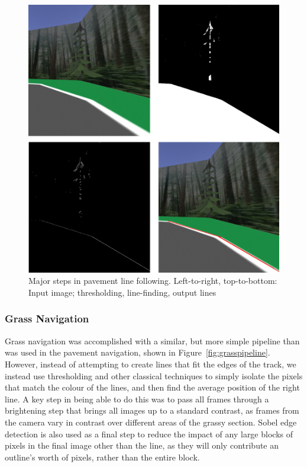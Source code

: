 \documentclass[titlepage, twocolumn]{article}
\begin{document}
            \begin{figure}
                \includegraphics[width=\linewidth]{lines.png}
                \caption{Major steps in pavement line following. Left-to-right, top-to-bottom: Input image; thresholding, line-finding, output lines}
                \label{fig:pavelinefollow}
            \end{figure}

        \subsubsection{Grass Navigation}

            Grass navigation was accomplished with a similar, but more simple pipeline than was used in the pavement navigation, shown in Figure~\ref{fig:grasspipeline}. However, instead of attempting to create lines that fit the edges of the track, we instead use thresholding and other classical techniques to simply isolate the pixels that match the colour of the lines, and then find the average position of the right line. A key step in being able to do this was to pass all frames through a brightening step that brings all images up to a standard contrast, as frames from the camera vary in contrast over different areas of the grassy section. Sobel edge detection is also used as a final step to reduce the impact of any large blocks of pixels in the final image other than the line, as they will only contribute an outline's worth of pixels, rather than the entire block. 
\end{document}
